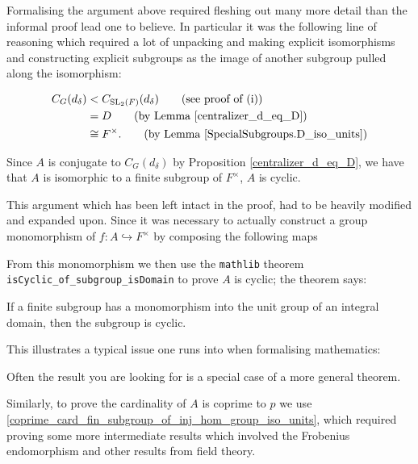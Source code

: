 \begin{remark}
Formalising the argument above required fleshing out many more detail than the informal proof lead one to
believe. In particular it was the following line of reasoning which required a lot of unpacking and making explicit
isomorphisms and constructing explicit subgroups as the image of another subgroup pulled along the isomorphism:

\begin{align*}  C_G(d_\delta) &<  C_{\SL_2(F)}(d_\delta)  \tag{see proof of (i)}
  \\ &= D  \tag{by Lemma \ref{centralizer_d_eq_D}}
  \\ &\cong F^\times.  \tag{by Lemma \ref{SpecialSubgroups.D_iso_units}}
  \end{align*}

Since $A$ is conjugate to $C_G(d_\delta)$ by Proposition \ref{centralizer_d_eq_D}, 
we have that $A$ is isomorphic to a finite subgroup of $F^\times$, $A$ is cyclic. 

This argument which has been left intact in the proof, had to be heavily modified and expanded upon. Since
it was necessary to actually construct a group monomorphism of $f : A \hookrightarrow F^\times$
by composing the following maps

\begin{center}
\end{center}

From this monomorphism we then use the \texttt{mathlib} theorem \texttt{isCyclic\_of\_subgroup\_isDomain} to prove $A$ is cyclic; the theorem says: 

If a finite subgroup has a monomorphism into the unit group of an integral domain, then the subgroup is cyclic.

This illustrates a typical issue one runs into when formalising mathematics:

Often the result you are looking for is a special case of a more general theorem.

Similarly, to prove the cardinality of $A$ is coprime to $p$ we use \ref{coprime_card_fin_subgroup_of_inj_hom_group_iso_units}, which required
proving some more intermediate results which involved the Frobenius endomorphism and other results from field theory.
\end{remark}

